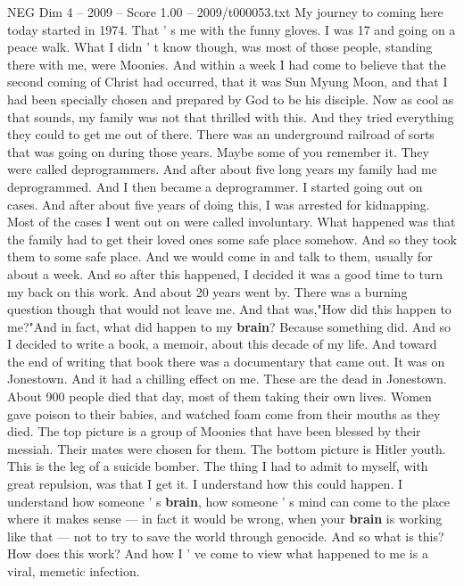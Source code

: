 \begin{textsample}{NEG Dim 4 – 2009 – Score 1.00 – 2009/t000053.txt}  \label{ex:f4_neg_037}
My journey to coming here today started in 1974.
That ' s me with the funny gloves.
I was 17 and going on a peace walk.
What I didn ' t know though, was most of those people, standing there with me, were Moonies.
And within a week I had come to believe that the second coming of Christ had occurred, that it was Sun Myung Moon, and that I had been specially chosen and prepared by God to be his disciple.
Now as cool as that sounds, my family was not that thrilled with this.
And they tried everything they could to get me out of there.
There was an underground railroad of sorts that was going on during those years.
Maybe some of you remember it.
They were called deprogrammers.
And after about five long years my family had me deprogrammed.
And I then became a deprogrammer.
I started going out on cases.
And after about five years of doing this, I was arrested for kidnapping.
Most of the cases I went out on were called involuntary.
What happened was that the family had to get their loved ones some safe place somehow.
And so they took them to some safe place.
And we would come in and talk to them, usually for about a week.
And so after this happened, I decided it was a good time to turn my back on this work.
And about 20 years went by.
There was a burning question though that would not leave me.
And that was,"How did this happen to me?"And in fact, what did happen to my \textbf{brain}?
Because something did.
And so I decided to write a book, a memoir, about this decade of my life.
And toward the end of writing that book there was a documentary that came out.
It was on Jonestown.
And it had a chilling effect on me.
These are the dead in Jonestown.
About 900 people died that day, most of them taking their own lives.
Women gave poison to their babies, and watched foam come from their mouths as they died.
The top picture is a group of Moonies that have been blessed by their messiah.
Their mates were chosen for them.
The bottom picture is Hitler youth.
This is the leg of a suicide bomber.
The thing I had to admit to myself, with great repulsion, was that I get it.
I understand how this could happen.
I understand how someone ' s \textbf{brain}, how someone ' s mind can come to the place where it makes sense — in fact it would be wrong, when your \textbf{brain} is working like that — not to try to save the world through genocide.
And so what is this?
How does this work?
And how I ' ve come to view what happened to me is a viral, memetic infection.

\end{textsample}
